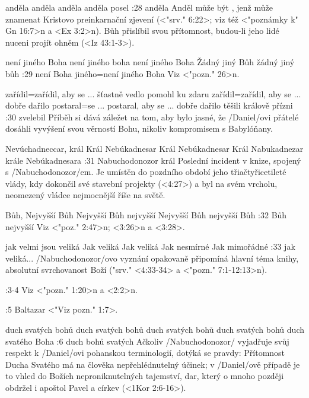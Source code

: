     {anděla} %
    {anděla}  %
    {anděla} %
    {anděla}  %
    {posel}  %
:28 {anděla} Anděl může být , jenž může znamenat Kristovo preinkarnační zjevení (<"srv." 6:22>; viz též <"poznámky k" Gn 16:7>n a <Ex 3:2>n). Bůh přislíbil svou přítomnost, budou-li jeho lidé nuceni projít ohněm (<Iz 43:1-3>). 

    {není jiného Boha} %
    {není jiného boha}  %
    {není jiného Boha} %
    {Žádný jiný Bůh}  %
    {žádný jiný bůh}  %
:29 {není Boha jiného}={není jiného Boha} Viz <"pozn." 26>n.

    {zařídil}={zařídil, aby se ... šťastně vedlo} %
    {pomohl ku zdaru}  %
    {zařídil}={zařídil, aby se ... dobře dařilo} %
    {postaral}={se ... postaral, aby se ... dobře dařilo}  %
    {těšili králově přízni}  %
:30 {zvelebil} Příběh si dává záležet na tom, aby bylo jasné, že \x/Daniel/ovi přátelé dosáhli vyvýšení svou věrností  Bohu, nikoliv kompromisem s Babylóňany. 

    {Nevúchadneccar, král}   %
    {Král Nebúkadnesar}   %
    {Král Nebúkadnesar}   %
    {Král Nabukadnezar}   %
    {krále Nebúkadnesara}   %
:31 {Nabuchodonozor král} Poslední incident v knize, spojený s \x/Nabuchodonozor/em. Je umístěn do pozdního období jeho třiačtyřicetileté vlády, kdy dokončil své stavební projekty (<4:27>) a byl na svém vrcholu, neomezený vládce nejmocnější říše na světě. 

    {Bůh, Nejvyšší}   %
    {Bůh Nejvyšší}   %
    {Bůh nejvyšší}   %
    {Nejvyšší Bůh}   %
    {nejvyšší Bůh}   %
:32 {Bůh nejvyšší} Viz <"poz." 2:47>n;  <3:26>n a <3:28>.

    {jak velmi jsou veliká}   %
    {Jak veliká}   %
    {Jak veliká}   %
    {Jak nesmírné}   %
    {Jak mimořádné}   %
:33 {jak veliká}...  \x/Nabuchodonozor/ovo vyznání opakovaně připomíná hlavní téma knihy, absolutní svrchovanost Boží ("srv." <4:33-34> a <"pozn." 7:1-12:13>n).

:3-4 {} Viz <"pozn." 1:20>n a <2:2>n.

:5 {Baltazar} <"Viz pozn." 1:7>.

    {duch svatých bohů}   %
    {duch svatých bohů}   %
    {duch svatých bohů}   %
    {duch svatých bohů}   %
    {duch svatého Boha}   %
:6 {duch bohů svatých} Ačkoliv \x/Nabuchodonozor/ vyjadřuje svůj respekt k \x/Daniel/ovi pohanskou terminologií, dotýká se pravdy: Přítomnost Ducha Svatého má na člověka nepřehlédnutelný účinek; v \x/Daniel/ově případě je to vhled do Božích neproniknutelných tajemství, dar, který o mnoho později obdržel i apoštol Pavel a církev  (<1Kor 2:6-16>).


